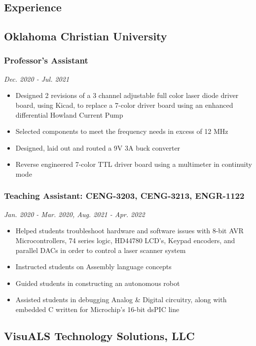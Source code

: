 \documentclass{article}
\begin{document}
\begin{spacing}{.5}
\section{Experience}
	\subsection{Oklahoma Christian University}
		\subsubsection{\large{Professor's Assistant}} \hfill \small{\textsl{Dec. 2020 - Jul. 2021}}
			\begin{itemize}[label=--,itemsep=-.35ex]
				\item \large{Designed 2 revisions of a 3 channel adjustable full color laser diode driver board, using Kicad, to replace a 7-color driver board using an enhanced differential Howland Current Pump}
				\item \large{Selected components to meet the frequency needs in excess of 12 MHz}
				\item \large{Designed, laid out and routed a 9V 3A buck converter}
				\item \large{Reverse engineered 7-color TTL driver board using a multimeter in continuity mode}
			\end{itemize}
		\subsubsection{\large{Teaching Assistant: CENG-3203, CENG-3213, ENGR-1122}} \hfill \small{\textsl{Jan. 2020 - Mar. 2020, Aug. 2021 - Apr. 2022}}
			\begin{itemize}[label=--,itemsep=-.35ex]
				\item \large{Helped students troubleshoot hardware and software issues with 8-bit AVR Microcontrollers, 74 series logic, HD44780 LCD's, Keypad encoders, and parallel DACs in order to control a laser scanner system}
				\item \large{Instructed students on Assembly language concepts}
				\item \large{Guided students in constructing an autonomous robot}
				\item \large{Assisted students in debugging Analog \& Digital circuitry, along with embedded C written for Microchip's 16-bit dsPIC line}
			\end{itemize}
	\subsection{VisuALS Technology Solutions, LLC}

\end{spacing}
\end{document}
